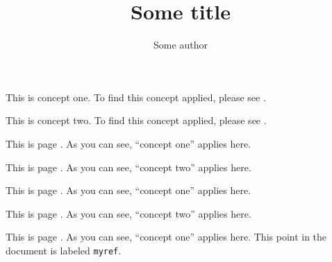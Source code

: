 \documentclass{article}
\begin{document}
\title{Some title}
\author{Some author}

\maketitle

This is concept one. To find this concept applied, please
see .

This is concept two. To find this concept applied, please
see .

\newpage

This is page \thepage. As you can see, ``concept
one'' applies here.\newpage

This is page \thepage. As you can see,
``concept two'' applies here.\newpage

This is page \thepage. As you can see, ``concept
one'' applies here.\newpage

This is page \thepage. As you can see,
``concept two'' applies here.\newpage

This is page \thepage. As you can
see, ``concept one'' applies here. This point in the document is
labeled \texttt{myref}.
\end{document}
